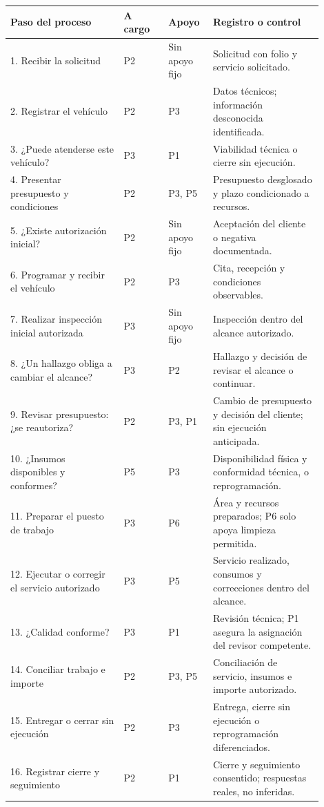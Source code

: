 {{\small\renewcommand{\arraystretch}{1.15}\begin{longtable}{@{}p{0.33\linewidth}p{0.13\linewidth}p{0.12\linewidth}p{0.32\linewidth}@{}}
\toprule \textbf{Paso del proceso} & \textbf{A cargo} & \textbf{Apoyo} & \textbf{Registro o control} \\ \midrule\endhead
1. Recibir la solicitud & P2 & Sin apoyo fijo & Solicitud con folio y servicio solicitado. \\ \midrule
2. Registrar el vehículo & P2 & P3 & Datos técnicos; información desconocida identificada. \\ \midrule
3. ¿Puede atenderse este vehículo? & P3 & P1 & Viabilidad técnica o cierre sin ejecución. \\ \midrule
4. Presentar presupuesto y condiciones & P2 & P3, P5 & Presupuesto desglosado y plazo condicionado a recursos. \\ \midrule
5. ¿Existe autorización inicial? & P2 & Sin apoyo fijo & Aceptación del cliente o negativa documentada. \\ \midrule
6. Programar y recibir el vehículo & P2 & P3 & Cita, recepción y condiciones observables. \\ \midrule
7. Realizar inspección inicial autorizada & P3 & Sin apoyo fijo & Inspección dentro del alcance autorizado. \\ \midrule
8. ¿Un hallazgo obliga a cambiar el alcance? & P3 & P2 & Hallazgo y decisión de revisar el alcance o continuar. \\ \midrule
9. Revisar presupuesto: ¿se reautoriza? & P2 & P3, P1 & Cambio de presupuesto y decisión del cliente; sin ejecución anticipada. \\ \midrule
10. ¿Insumos disponibles y conformes? & P5 & P3 & Disponibilidad física y conformidad técnica, o reprogramación. \\ \midrule
11. Preparar el puesto de trabajo & P3 & P6 & Área y recursos preparados; P6 solo apoya limpieza permitida. \\ \midrule
12. Ejecutar o corregir el servicio autorizado & P3 & P5 & Servicio realizado, consumos y correcciones dentro del alcance. \\ \midrule
13. ¿Calidad conforme? & P3 & P1 & Revisión técnica; P1 asegura la asignación del revisor competente. \\ \midrule
14. Conciliar trabajo e importe & P2 & P3, P5 & Conciliación de servicio, insumos e importe autorizado. \\ \midrule
15. Entregar o cerrar sin ejecución & P2 & P3 & Entrega, cierre sin ejecución o reprogramación diferenciados. \\ \midrule
16. Registrar cierre y seguimiento & P2 & P1 & Cierre y seguimiento consentido; respuestas reales, no inferidas. \\ \midrule
\end{longtable}}
}
